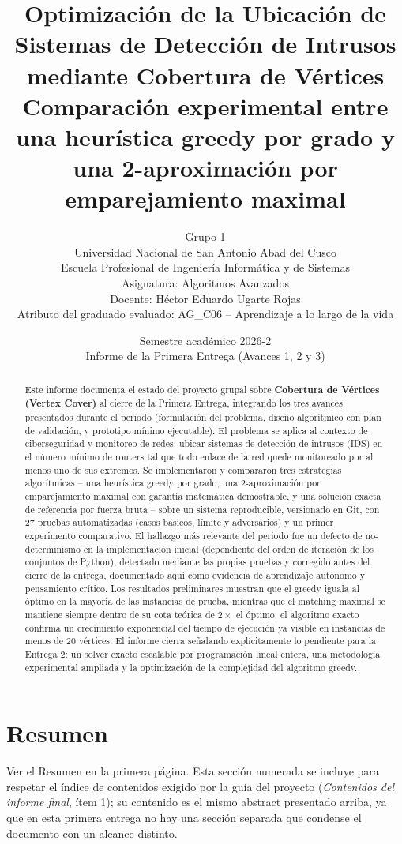 \documentclass[11pt,a4paper]{article}
\title{
	\vspace{-1cm}
	\textbf{Optimización de la Ubicación de Sistemas de Detección de Intrusos \\
	mediante Cobertura de Vértices} \\
	\large Comparación experimental entre una heurística greedy por grado y una
	2-aproximación por emparejamiento maximal
}
\author{
	Grupo 1 \\
	\small Universidad Nacional de San Antonio Abad del Cusco \\
	\small Escuela Profesional de Ingeniería Informática y de Sistemas \\
	\small Asignatura: Algoritmos Avanzados \\
	\small Docente: Héctor Eduardo Ugarte Rojas \\
	\small Atributo del graduado evaluado: AG\_C06 -- Aprendizaje a lo largo de la vida
}
\date{Semestre académico 2026-2 \\ Informe de la Primera Entrega (Avances 1, 2 y 3)}
\begin{document}
\maketitle
\thispagestyle{fancy}

\begin{abstract}
\noindent
Este informe documenta el estado del proyecto grupal sobre \textbf{Cobertura de Vértices
(Vertex Cover)} al cierre de la Primera Entrega, integrando los tres avances presentados
durante el periodo (formulación del problema, diseño algorítmico con plan de validación, y
prototipo mínimo ejecutable). El problema se aplica al contexto de ciberseguridad y
monitoreo de redes: ubicar sistemas de detección de intrusos (IDS) en el número mínimo de
routers tal que todo enlace de la red quede monitoreado por al menos uno de sus extremos.
Se implementaron y compararon tres estrategias algorítmicas -- una heurística greedy por
grado, una 2-aproximación por emparejamiento maximal con garantía matemática demostrable, y
una solución exacta de referencia por fuerza bruta -- sobre un sistema reproducible, versionado
en Git, con 27 pruebas automatizadas (casos básicos, límite y adversarios) y un primer
experimento comparativo. El hallazgo más relevante del periodo fue un defecto de
no-determinismo en la implementación inicial (dependiente del orden de iteración de los
conjuntos de Python), detectado mediante las propias pruebas y corregido antes del cierre
de la entrega, documentado aquí como evidencia de aprendizaje autónomo y pensamiento
crítico. Los resultados preliminares muestran que el greedy iguala al óptimo en la mayoría
de las instancias de prueba, mientras que el matching maximal se mantiene siempre dentro de
su cota teórica de $2\times$ el óptimo; el algoritmo exacto confirma un crecimiento
exponencial del tiempo de ejecución ya visible en instancias de menos de 20 vértices. El
informe cierra señalando explícitamente lo pendiente para la Entrega 2: un solver exacto
escalable por programación lineal entera, una metodología experimental ampliada y la
optimización de la complejidad del algoritmo greedy.
\end{abstract}

\tableofcontents
\thispagestyle{fancy}
\newpage

\section{Resumen}

Ver el Resumen en la primera página. Esta sección numerada se incluye para respetar el
índice de contenidos exigido por la guía del proyecto (\emph{Contenidos del informe final},
ítem 1); su contenido es el mismo abstract presentado arriba, ya que en esta primera
entrega no hay una sección separada que condense el documento con un alcance distinto.
\end{document}
